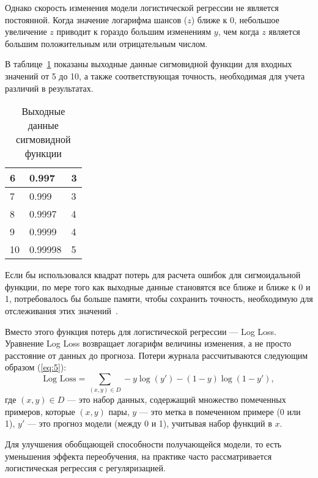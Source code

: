 Однако скорость изменения модели логистической регрессии не является постоянной.
Когда значение логарифма шансов ($z$) ближе к 0, небольшое увеличение $z$ приводит к гораздо большим изменениям $y$, чем когда $z$ является большим положительным или отрицательным числом.

В таблице~\ref{tab:tabl2} показаны выходные данные сигмовидной функции для входных значений от 5 до 10, а также соответствующая точность, необходимая для учета различий в результатах.
\begin{table}[ht]
    \centering
    \caption{Выходные данные сигмовидной функции}
    \begin{tabularx}{\textwidth}{|X|X|X|}
        \hline
        6 & 0.997 & 3 \\
        \hline
        7 & 0.999 & 3 \\
        \hline
        8 & 0.9997 & 4 \\
        \hline
        9 & 0.9999 & 4 \\
        \hline
        10 & 0.99998 & 5 \\
        \hline
    \end{tabularx}
    \label{tab:tabl2}
\end{table}

Если бы использовался квадрат потерь для расчета ошибок для сигмоидальной функции, по мере того как выходные данные становятся все ближе и ближе к 0 и 1, потребовалось бы больше памяти, чтобы сохранить точность, необходимую для отслеживания этих значений~\cite{google2}.

Вместо этого функция потерь для логистической регрессии --- Log Loss.
Уравнение Log Loss возвращает логарифм величины изменения, а не
просто расстояние от данных до прогноза.
Потери журнала рассчитываются следующим образом (\ref{eq:5}):
\begin{equation}
    \text{Log Loss} = \sum_{(x, y)\in D} -y\log(y') - (1 - y)\log(1 - y'),
    \label{eq:5}
\end{equation}
где $(x,y)\in D$ --- это набор данных, содержащий множество помеченных примеров, которые $(x,y)$ пары, $y$ --- это метка в помеченном примере (0 или 1), $y'$ --- это прогноз модели (между 0 и 1), учитывая набор функций в $x$.

Для улучшения обобщающей способности получающейся модели, то есть уменьшения эффекта переобучения, на практике часто рассматривается логистическая регрессия с регуляризацией.





